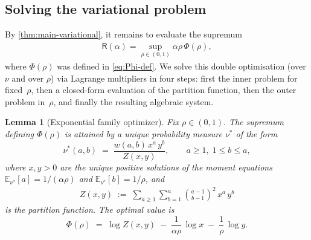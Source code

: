 \documentclass[11pt]{amsart}
\numberwithin{equation}{section}
\numberwithin{equation}{section}
\newcommand{\1}{\mathbbm{1}}
\newcommand{\E}{\mathbb{E}}
\newtheorem{lemma}[theorem]{Lemma}
\theoremstyle{definition}
\begin{document}
\subsection{Solving the variational problem}\label{subsec:solve-variational}

By \cref{thm:main-variational}, it remains to evaluate the supremum
\begin{align*}
    \mathsf R(\alpha)=\sup_{\rho\in(0,1)}\alpha\rho\,\Phi(\rho),
\end{align*}
where $\Phi(\rho)$ was defined in \eqref{eq:Phi-def}. We solve this double optimisation (over $\nu$ and over $\rho$) via Lagrange multipliers in four steps: first the inner problem for fixed~$\rho$, then a closed-form evaluation of the partition function, then the outer problem in~$\rho$, and finally the resulting algebraic system.

\begin{lemma}[Exponential family optimizer]\label{lem:inner-optimizer}
Fix $\rho\in(0,1).$ The supremum defining $\Phi(\rho)$ is attained by a unique probability measure $\nu^*$ of the form
\begin{equation}\label{eq:inner-optimizer-form}
    \nu^*(a,b)\;=\;\frac{w(a,b)\,x^a\,y^b}{Z(x,y)},\qquad a\ge 1,\;1\le b\le a,
\end{equation}
where $x,y>0$ are the unique positive solutions of the moment equations $\E_{\nu^*}[a]=1/(\alpha\rho)$ and $\E_{\nu^*}[b]=1/\rho$, and
\begin{align*}
    Z(x,y)\;:=\;\sum_{a\ge 1}\sum_{b=1}^{a}\binom{a-1}{b-1}^{2}\,x^{a}\,y^{b}
\end{align*}
is the partition function. The optimal value is
\begin{equation}\label{eq:Phi-from-Z}
    \Phi(\rho)\;=\;\log Z(x,y)\;-\;\frac{1}{\alpha\rho}\,\log x\;-\;\frac{1}{\rho}\,\log y.
\end{equation}
\end{lemma}
\end{document}
